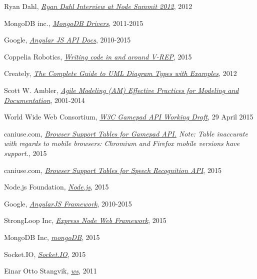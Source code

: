 \begin{thebibliography}{99}
Ryan Dahl,
\emph{\href{https://youtu.be/Fc26auhSLqM?t=1m32s}{Ryan Dahl Interview at Node Summit 2012}},  
2012

MongoDB inc.,
\emph{\href{http://docs.mongodb.org/ecosystem/drivers/}{MongoDB Drivers}},  
2011-2015

Google,
\emph{\href{https://docs.angularjs.org/api?PHPSESSID=cae8e98e7ca559b4605d75c813b358ee}{Angular JS API Docs}},  
2010-2015

Coppelia Robotics,
\emph{\href{http://www.coppeliarobotics.com/helpFiles/en/writingCode.htm}{Writing code in and around V-REP}},  
2015

Creately,
\emph{\href{http://creately.com/blog/diagrams/uml-diagram-types-examples/}{The Complete Guide to UML Diagram Types with Examples}},  
2012

Scott W. Ambler,
\emph{\href{http://agilemodeling.com/}{Agile Modeling (AM) Effective Practices for Modeling and Documentation}},  
2001-2014

World Wide Web Consortium,
\emph{\href{http://www.w3.org/TR/gamepad/}{W3C Gamepad API Working Draft}},  
29 April 2015

caniuse.com,
\emph{\href{http://caniuse.com/\#feat=gamepad}{Browser Support Tables for Gamepad API.} Note: Table inaccurate with regards to mobile browsers: Chromium and Firefox mobile versions have support.},  
2015

caniuse.com,
\emph{\href{http://caniuse.com/\#feat=speech-recognition}{Browser Support Tables for Speech Recognition API}},  
2015

Node.js Foundation,
\emph{\href{https://nodejs.org/}{Node.js}},  
2015

Google,
\emph{\href{https://angularjs.org/}{AngularJS Framework}},  
2010-2015

StrongLoop Inc,
\emph{\href{http://expressjs.com/}{Express Node Web Framework}},  
2015

MongoDB Inc,
\emph{\href{https://www.mongodb.org/}{mongoDB}},  
2015

Socket.IO,
\emph{\href{http://socket.io/}{Socket.IO}},  
2015

Einar Otto Stangvik,
\emph{\href{https://github.com/websockets/ws}{ws}},  
2011


\end{thebibliography}
